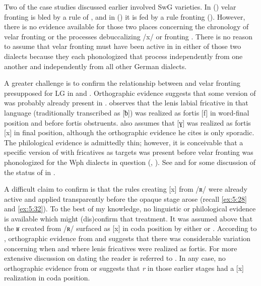 Two of the case studies discussed earlier involved SwG varieties. In  () velar fronting is bled by a rule of , and in  () it is fed by a rule fronting  (). However, there is no evidence available for those two places concerning the chronology of velar fronting or the processes debuccalizing /x/ or fronting . There is no reason to assume that velar fronting must have been active in  in either of those two dialects because they each phonologized that process independently from one another and independently from all other German dialects.

A greater challenge is to confirm the relationship between  and velar fronting presupposed for LG in  and . Orthographic evidence suggests that some version of  was probably already present in . \citet[78]{Holthausen1900} observes that the lenis labial fricative in that language (traditionally transcribed as [ƀ]) was realized as fortis [f] in word-final position and before fortis obstruents. \citet[81]{Holthausen1900} also assumes that [ɣ] was realized as fortis [x] in final position, although the orthographic evidence he cites is only sporadic. The philological evidence is admittedly thin; however, it is conceivable that a specific version of  with fricatives as targets was present before velar fronting was phonologized for the Wph dialects in question (, ). See \citet[1759]{Foerste1957} and \citet[23--27]{Woods1975} for some discussion of the status of  in .

A difficult claim to confirm is that the rules creating [x] from /ʀ/ were already active and applied transparently before the opaque stage arose (recall \ref{ex:5:28} and \ref{ex:5:32}). To the best of my knowledge, no linguistic or philological evidence is available which might (dis)confirm that treatment. It was assumed above that the {\textbar}ʁ{\textbar} created from /ʀ/ surfaced as [x] in coda position by either  or . According to \citet[131--133]{Paul2007}, orthographic evidence from  and  suggests that there was considerable variation concerning when and where lenis fricatives were realized as fortis. For more extensive discussion on dating  the reader is referred to \citet{Mihm2004}. In any case, no orthographic evidence from  or  suggests that \textit{r} in those earlier stages had a [x] realization in coda position.

